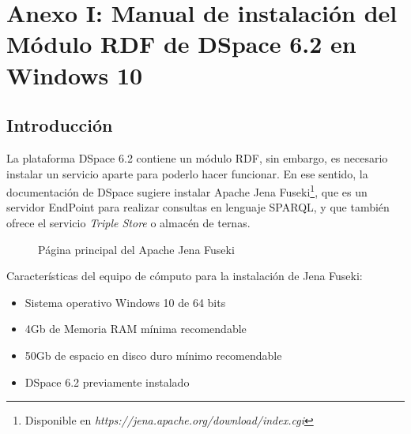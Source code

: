 \renewcommand{\chaptername}{Capitulo}
\chapter{Anexo I: Manual de instalación del Módulo RDF de DSpace 6.2 en Windows 10} 
\section{Introducción}

La plataforma DSpace 6.2 contiene un módulo RDF, sin embargo, es necesario instalar un servicio aparte para poderlo hacer funcionar. En ese sentido, la documentación de DSpace sugiere instalar Apache Jena Fuseki\footnote{Disponible en \textit{https://jena.apache.org/download/index.cgi}}, que es un servidor EndPoint para realizar consultas en lenguaje SPARQL, y que también ofrece el servicio \textit{Triple Store} o almacén de ternas.\newline

\begin{figure}[!ht]
	\centering
    \caption{Página principal del Apache Jena Fuseki}
    \label{landing-page-apache-jena-fiseki}
\end{figure}

Características del equipo de cómputo para la instalación de Jena Fuseki:

\begin{itemize}
    \item Sistema operativo Windows 10 de 64 bits
    \item 4Gb de Memoria RAM mínima recomendable
    \item 50Gb de espacio en disco duro mínimo recomendable
    \item DSpace 6.2 previamente instalado
\end{itemize}{}

